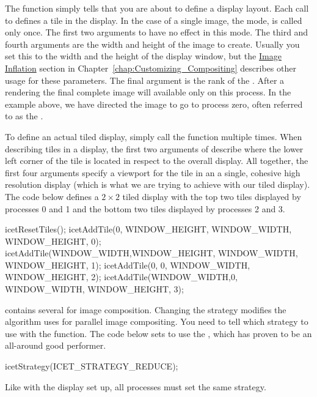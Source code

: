 The  function simply tells \IceT that you are about
to define a display layout.  Each call to  defines a
tile in the display.  In the case of a single image, the
 mode,
 is called only once.  The first two arguments to
 have no effect in this mode.  The third and fourth
arguments are the width and height of the image to create.  Usually you set
this to the width and the height of the display window, but the
\hyperref[sec:Customizing_Compositing:Image_Inflation]{Image Inflation}
section in Chapter~\ref{chap:Customizing_Compositing} describes other usage
for these parameters.  The final argument is the rank of the
.  After a rendering the
final complete image will available only on this process.  In the example
above, we have directed the image to go to process zero, often referred to
as the .

To define an actual tiled display, simply call the 
function multiple times.  When describing tiles in a display, the first two
arguments of  describe where the lower left corner of
the tile is located in respect to the overall display.  All together, the
first four arguments specify a viewport for the tile in an a single,
cohesive high resolution display (which is what we are trying to achieve
with our tiled display).  The code below defines a $2 \times 2$ tiled
display with the top two tiles displayed by processes 0 and 1 and the
bottom two tiles displayed by processes 2 and 3.
\begin{code}
icetResetTiles();
icetAddTile(0,           WINDOW_HEIGHT, WINDOW_WIDTH, WINDOW_HEIGHT, 0);
icetAddTile(WINDOW_WIDTH,WINDOW_HEIGHT, WINDOW_WIDTH, WINDOW_HEIGHT, 1);
icetAddTile(0,           0,             WINDOW_WIDTH, WINDOW_HEIGHT, 2);
icetAddTile(WINDOW_WIDTH,0,             WINDOW_WIDTH, WINDOW_HEIGHT, 3);
\end{code}

\IceT contains several  for image
composition.  Changing the strategy modifies the algorithm \IceT uses for
parallel image compositing.  You need to tell \IceT which strategy to use
with the  function.  The code below sets \IceT to use
the , which has proven to
be an all-around good performer.
\begin{code}
icetStrategy(ICET_STRATEGY_REDUCE);
\end{code}
Like with the display set up, all processes must set the same strategy.

